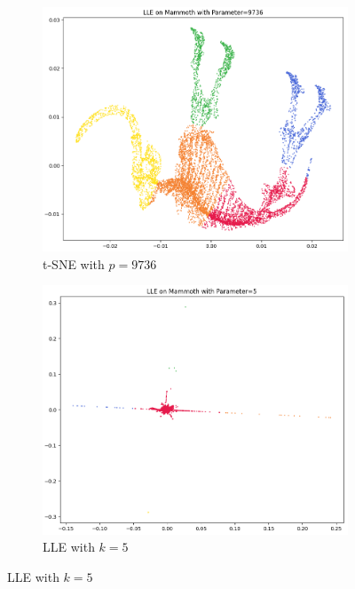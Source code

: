\begin{figure}[!]
     \hfill
     \begin{subfigure}[t]{0.49\columnwidth}
    	\centering
    	\includegraphics[width=\columnwidth]{images/KMEANS_5_TSNE_9736.png}
    	\caption{t-SNE with $p=9736$}
        \label{fig:KMEANS_5_TSNE_9736}
    \end{subfigure}
    \hfill
     \begin{subfigure}[t]{0.49\columnwidth}
    	\centering
    	\includegraphics[width=\columnwidth]{images/KMEANS_5_LLE_5.png}
    	\caption{LLE with $k=5$}
        \label{fig:KMEANS_5_LLE_5}
    \end{subfigure}

\end{figure}
